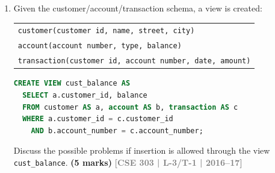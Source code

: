 \documentclass[12pt]{article}
\newcommand{\yr}[1]{\hfill\textcolor{gray}{\small\textbf{[#1]}}}
\newcommand{\mk}[1]{\textcolor{orange!70!black}{\small\textbf{(#1 marks)}}}
\begin{document}
\begin{enumerate}
\item Given the customer/account/transaction schema, a view is created:
\begin{center}
  \begin{tabular}{l}
    \texttt{customer(customer id, name, street, city)}\\
    \texttt{account(account number, type, balance)}\\
    \texttt{transaction(customer id, account number, date, amount)}
  \end{tabular}
\end{center}

\begin{lstlisting}[language=SQL]
CREATE VIEW cust_balance AS
  SELECT a.customer_id, balance
  FROM customer AS a, account AS b, transaction AS c
  WHERE a.customer_id = c.customer_id
    AND b.account_number = c.account_number;
\end{lstlisting}
Discuss the possible problems if insertion is allowed through the view \texttt{cust\_balance}.
\mk{5} \yr{CSE 303 | L-3/T-1 | 2016--17}



\end{enumerate}
\end{document}
